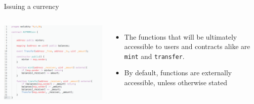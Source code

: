 \documentclass[10pt]{beamer}
\begin{document}
\begin{frame}{Issuing a currency}
	\begin{columns}
	    \includegraphics  [scale=0.3]{Images/contract_new}

	    \begin{itemize}
			\item The functions that will be ultimately accessible to users and contracts alike are \texttt{mint} and \texttt{transfer}.
			\item By default, functions are externally accessible, unless otherwise stated
	    \end{itemize}
	\end{columns}
\end{frame}

\end{document}
